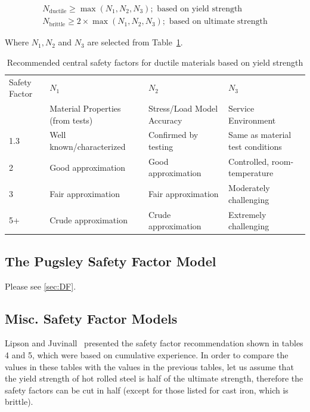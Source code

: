 \begin{eqnarray}
  N_{\text{ductile}} \geq \max(N_1, N_2, N_3); \text{ based on yield strength} \\
  N_{\text{brittle}} \geq 2\times\max(N_1, N_2, N_3); \text{ based on ultimate strength}
\end{eqnarray}

\noindent Where $N_1, N_2$ and $N_3$ are selected from Table~\ref{tbl-norton}.

\begin{table}
  \centering
  \small
  \begin{tabular}{p{} p{} p{} p{}}
    \toprule
      Safety Factor & $N_1$ & $N_2$ & $N_3$ \\
      & Material Properties (from tests) & Stress/Load Model Accuracy & Service Environment \\
    \midrule
    1.3 & Well known/characterized & Confirmed by testing & Same as material test conditions \\
    2 & Good approximation & Good approximation & Controlled, room-temperature \\
    3 & Fair approximation & Fair approximation & Moderately challenging \\
    5+ & Crude approximation & Crude approximation & Extremely challenging\\
    \bottomrule
  \end{tabular}
  \label{tbl-norton}
  \caption[Recommended central safety factors for ductile materials based on yield strength]{Recommended central safety factors for ductile materials based on yield strength \cite{robert2006}}
\end{table}

\subsection{The Pugsley Safety Factor Model}

Please see \cref{sec:DF}.

\subsection{Misc. Safety Factor Models}

Lipson and Juvinall~\cite{lipson1963} presented the safety factor recommendation shown in tables 4 and 5, which were based on cumulative experience. In order to compare the values in these tables with the values in the previous tables, let us assume that the yield strength of hot rolled steel is half of the ultimate strength, therefore the safety factors can be cut in half (except for those listed for cast iron, which is brittle).

